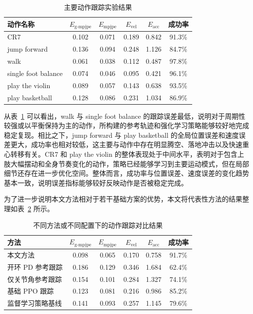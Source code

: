 \begin{table}[htbp]
  \centering
  \caption{主要动作跟踪实验结果}
  \label{tab:main_tracking_results}
  \vspace{0.5em}\centering\wuhao
  \begin{tabular}{lccccc}
    \toprule
    动作名称 & $E_{\mathrm{g\text{-}mpjpe}}$ & $E_{\mathrm{mpjpe}}$ & $E_{\mathrm{vel}}$ & $E_{\mathrm{acc}}$ & 成功率 \\
    \midrule
    CR7 & 0.102 & 0.071 & 0.189 & 0.842 & 91.3\% \\
    jump forward & 0.136 & 0.094 & 0.248 & 1.126 & 84.7\% \\
    walk & 0.061 & 0.038 & 0.112 & 0.487 & 97.8\% \\
    single foot balance & 0.074 & 0.046 & 0.095 & 0.421 & 96.1\% \\
    play the violin & 0.089 & 0.057 & 0.143 & 0.638 & 93.5\% \\
    play basketball & 0.128 & 0.086 & 0.231 & 1.034 & 86.9\% \\
    \bottomrule
  \end{tabular}
\end{table}

从表~\ref{tab:main_tracking_results} 可以看出，walk 与 single foot balance 的跟踪误差最低，说明对于周期性较强或以平衡保持为主的动作，所构建的参考轨迹和强化学习策略能够较好地完成稳定复现。相比之下，jump forward 与 play basketball 的全局位置误差和速度误差更大，成功率也相对较低，这主要与动作中存在明显腾空、落地冲击以及快速重心转移有关。CR7 和 play the violin 的整体表现处于中间水平，表明对于包含上肢大幅摆动和全身节奏变化的动作，策略已经能够学习到主要运动模式，但在局部细节还存在进一步优化空间。整体而言，成功率与位置误差、速度误差的变化趋势基本一致，说明误差指标能够较好反映动作是否被稳定完成。

为了进一步说明本文方法相对于若干基础方案的优势，本文将代表性方法的结果整理如表~\ref{tab:baseline_comparison} 所示。

\begin{table}[htbp]
  \caption{不同方法或不同配置下的动作跟踪对比结果}
  \label{tab:baseline_comparison}
  \vspace{0.5em}\centering\wuhao
  \begin{tabular}{lccccc}
    \toprule
    方法 & $E_{\mathrm{g\text{-}mpjpe}}$ & $E_{\mathrm{mpjpe}}$ & $E_{\mathrm{vel}}$ & $E_{\mathrm{acc}}$ & 成功率 \\
    \midrule
    本文方法 & 0.098 & 0.065 & 0.170 & 0.758 & 91.7\% \\
    开环 PD 参考跟踪 & 0.186 & 0.129 & 0.346 & 1.684 & 62.4\% \\
    仅关节角参考跟踪 & 0.154 & 0.101 & 0.284 & 1.327 & 74.1\% \\
    基础 PPO 跟踪 & 0.123 & 0.081 & 0.216 & 0.986 & 85.2\% \\
    监督学习策略基线 & 0.141 & 0.093 & 0.257 & 1.145 & 79.6\% \\
    \bottomrule
  \end{tabular}
\end{table}




